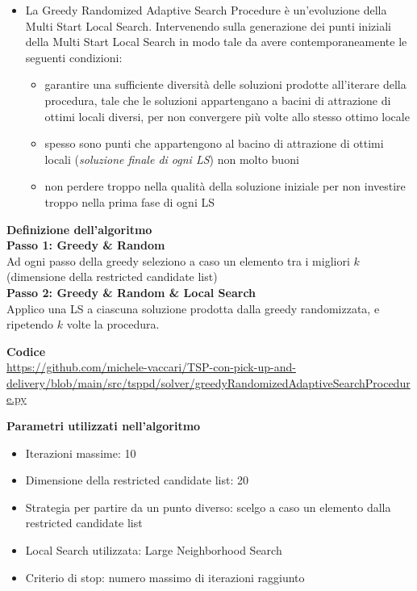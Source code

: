 \documentclass[9pt]{beamer}
\begin{document}
\begin{frame}[allowframebreaks]{\subsecname}
\begin{itemize}
		\item
		La Greedy Randomized Adaptive Search Procedure è un’evoluzione della Multi Start Local Search. Intervenendo sulla generazione dei punti iniziali della Multi Start Local Search in modo tale da avere contemporaneamente le seguenti condizioni:
		\begin{itemize}
			\item
			garantire una sufficiente diversità delle soluzioni prodotte all’iterare della procedura, tale che le soluzioni appartengano a bacini di attrazione di ottimi locali diversi, per non convergere più volte allo stesso ottimo locale
			\item
			spesso sono punti che appartengono al bacino di attrazione di ottimi locali (\emph{soluzione finale di ogni LS}) non molto buoni
			\item
			non perdere troppo nella qualità della soluzione iniziale per non investire troppo nella prima fase di ogni LS
		\end{itemize}
		
	\end{itemize}

\framebreak

	\textbf{Definizione dell'algoritmo} \\
	\textbf{\footnotesize Passo 1: Greedy \& Random} \\
	Ad ogni passo della greedy seleziono a caso un elemento tra i migliori $k$ (dimensione della restricted candidate list) \\
	\textbf{\footnotesize Passo 2: Greedy \& Random \& Local Search} \\
	Applico una LS a ciascuna soluzione prodotta dalla greedy randomizzata, e ripetendo $k$ volte la procedura.

	\textbf{Codice} \\
	\href{https://github.com/michele-vaccari/TSP-con-pick-up-and-delivery/blob/main/src/tsppd/solver/greedyRandomizedAdaptiveSearchProcedure.py}{https://github.com/michele-vaccari/TSP-con-pick-up-and-delivery/blob/main/src/tsppd/solver/greedyRandomizedAdaptiveSearchProcedure.py}

\framebreak

	\textbf{Parametri utilizzati nell'algoritmo}
	\begin{itemize}
		\item
		Iterazioni massime: 10
		\item
		Dimensione della restricted candidate list: 20
		\item
		Strategia per partire da un punto diverso: scelgo a caso un elemento dalla restricted candidate list
		\item
		Local Search utilizzata: Large Neighborhood Search
		\item
		Criterio di stop: numero massimo di iterazioni raggiunto
	\end{itemize}


\end{frame}
\end{document}
